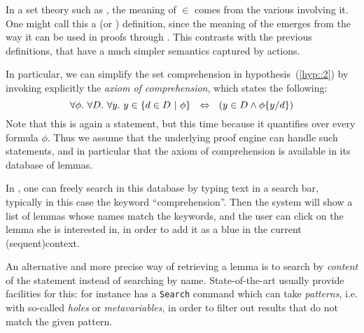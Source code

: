 \AP In a set theory such as , the meaning of $\in$ comes from the various
 involving it. One might call this a  (or
) definition, since the meaning of the  emerges
from the way it can be used in proofs through . This contrasts with
the previous  definitions, that have a much simpler semantics
captured by  actions.

In particular, we can simplify the set comprehension in
hypothesis~(\ref{hyp::2}) by invoking explicitly the \emph{axiom of
comprehension}, which states the following:
$$\forall \phi.\ \forall D.\ \forall y.\ y \in \left\{d \in D ~\middle|~ \phi\right\}
~~\Leftrightarrow~~ (y \in D \land \phi \{ y / d \})$$
Note that this is again a  statement, but this time because it
quantifies over every formula $\phi$. Thus we assume that the underlying proof
engine can handle such  statements, and in particular that the
axiom of comprehension is available in its database of lemmas.

In , one can freely search in this database by typing text in a
search bar, typically in this case the keyword ``comprehension''. Then the
system will show a list of lemmas whose names match the keywords, and the
user can click on the lemma she is interested in, in order to add it as a
blue  in the current \kl(sequent){context}.

An alternative and more precise way of retrieving a lemma is to search by
\emph{content} of the statement instead of searching by name. State-of-the-art
 usually provide facilities for this: for instance 
has a \texttt{Search} command which can take \emph{patterns}, i.e. 
with so-called \emph{holes} or \emph{metavariables}, in order to filter out
results that do not match the given pattern.

